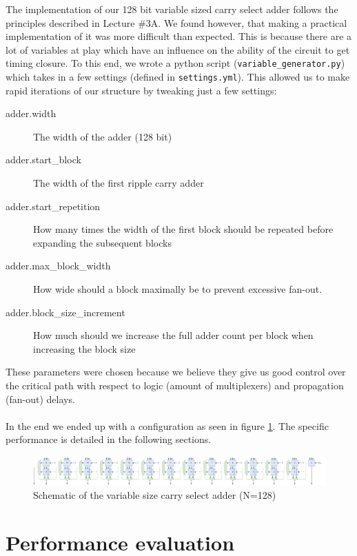\documentclass[a4paper,kul]{kulakarticle} %
\begin{document}
The implementation of our 128 bit variable sized carry select adder follows the principles described in Lecture \#3A. We found however, that making a practical implementation of it was more difficult than expected. This is because there are a lot of variables at play which have an influence on the ability of the circuit to get timing closure. To this end, we wrote a python script (\texttt{variable\_generator.py}) which takes in a few settings (defined in \texttt{settings.yml}). This allowed us to make rapid iterations of our structure by tweaking just a few settings:
\begin{description}
	\item[adder.width] The width of the adder (128 bit)
	\item[adder.start\_block] The width of the first ripple carry adder 
	\item[adder.start\_repetition] How many times the width of the first block should be repeated before expanding the subsequent blocks
	\item[adder.max\_block\_width] How wide should a block maximally be to prevent excessive fan-out. 
	\item[adder.block\_size\_increment] How much should we increase the full adder count per block when increasing the block size
\end{description}
These parameters were chosen because we believe they give us good control over the critical path with respect to logic (amount of multiplexers) and propagation (fan-out) delays. \\
\\
In the end we ended up with a configuration as seen in figure \ref{fig:128bit-adder}. The specific performance is detailed in the following sections. 
\begin{figure}[h]
	\centering
	\includegraphics[width=1\linewidth]{images/128bit-ADDER}
	\caption{Schematic of the variable size carry select adder (N=128)}
	\label{fig:128bit-adder}
\end{figure}

\section{Performance evaluation}

\end{document}
